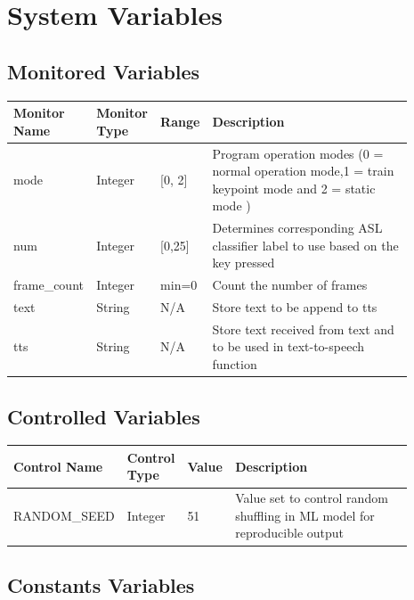 \documentclass[12pt, titlepage]{article}
\begin{document}
\section{System Variables}
\subsection{Monitored Variables}

\renewcommand{\arraystretch}{1.2}
\noindent \begin{tabularx}{\textwidth}{p{0.15\linewidth}|p{0.12\linewidth}|p{0.12\linewidth}|p{0.5\linewidth}}
\toprule
\textbf{Monitor Name} & \textbf{Monitor Type} & \textbf{Range} & \textbf{Description}\\
\midrule
mode & Integer & [0, 2] & Program operation modes (0 = normal operation mode,1 = train keypoint mode and 2 = static mode )\\
\hline
num & Integer & [0,25] & Determines corresponding ASL classifier label to use based on the key pressed\\
\hline
frame\_count & Integer & min=0 & Count the number of frames\\
\hline
text & String & N/A & Store text to be append to tts\\
\hline
tts & String & N/A & Store text received from text and to be used in text-to-speech function\\
\bottomrule
\end{tabularx}

\subsection{Controlled Variables}

\renewcommand{\arraystretch}{1.2}
\noindent \begin{tabularx}{\textwidth}{p{0.2\linewidth}|p{0.12\linewidth}|p{0.12\linewidth}|p{0.45\linewidth}}
\toprule
\textbf{Control Name} & \textbf{Control Type} & \textbf{Value} & \textbf{Description}\\
\midrule
RANDOM\_SEED & Integer & 51 & Value set to control random shuffling in ML model for reproducible output\\
\bottomrule
\end{tabularx}

\subsection{Constants Variables}
\end{document}
